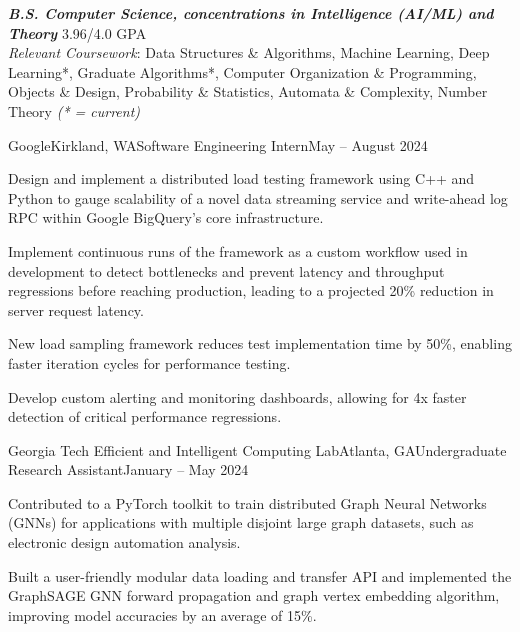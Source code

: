 \documentclass{article}
\begin{document}
\thispagestyle{empty}


\begin{flushleft}


{\textbf{\textit{B.S. Computer Science, concentrations in Intelligence (AI/ML) and Theory}} \hfill 3.96/4.0 GPA \\ \textit{Relevant Coursework}: Data Structures \& Algorithms, Machine Learning, Deep Learning*, Graduate Algorithms*, Computer Organization \& Programming, Objects \& Design, Probability \& Statistics, Automata \& Complexity, Number Theory \textit{(* = current)}}



    \begin{experience}{Google}{Kirkland, WA}{Software Engineering Intern}{May -- August 2024}
        \item Design and implement a distributed load testing framework using C++ and Python to gauge scalability of a novel data streaming service and write-ahead log RPC within Google BigQuery's core infrastructure.
        \item Implement continuous runs of the framework as a custom workflow used in development to detect bottlenecks and prevent latency and throughput regressions before reaching production, leading to a projected 20\% reduction in server request latency.
        \item New load sampling framework reduces test implementation time by 50\%, enabling faster iteration cycles for performance testing.
        \item Develop custom alerting and monitoring dashboards, allowing for 4x faster detection of critical performance regressions.
    \end{experience}

    \begin{experience}{Georgia Tech Efficient and Intelligent Computing Lab}{Atlanta, GA}{Undergraduate Research Assistant}{January -- May 2024}
        \item Contributed to a PyTorch toolkit to train distributed Graph Neural Networks (GNNs) for applications with multiple disjoint large graph datasets, such as electronic design automation analysis.
        \item Built a user-friendly modular data loading and transfer API and implemented the GraphSAGE GNN forward propagation and graph vertex embedding algorithm, improving model accuracies by an average of 15\%.
    \end{experience}


\end{flushleft}
\end{document}
